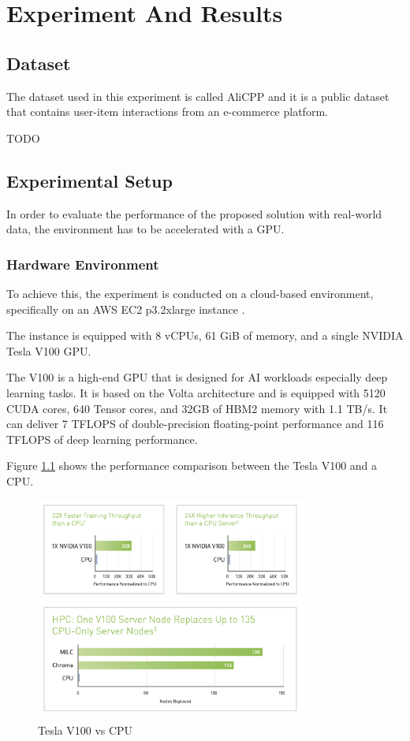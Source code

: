 \chapter{Experiment And Results}
\minitoc

\section{Dataset}

The dataset used in this experiment is called AliCPP and it is a public dataset that contains user-item interactions from an e-commerce platform.

TODO


\section{Experimental Setup}

In order to evaluate the performance of the proposed solution with real-world data, the environment has to be accelerated with a GPU.

\subsection{Hardware Environment}

To achieve this, the experiment is conducted on a cloud-based environment, specifically on an AWS EC2 p3.2xlarge instance \cite{AwsEc2P3}.

The instance is equipped with 8 vCPUs, 61 GiB of memory, and a single NVIDIA Tesla V100 GPU.

The V100 is a high-end GPU that is designed for AI workloads especially deep learning tasks.
It is based on the Volta architecture and is equipped with 5120 CUDA cores, 640 Tensor cores, and 32GB of HBM2 memory with 1.1 TB/s.
It can deliver 7 TFLOPS of double-precision floating-point performance and 116 TFLOPS of deep learning performance.

Figure \ref{fig:V100vsCPU} shows the performance comparison between the Tesla V100 and a CPU.


\begin{figure}[H]
    \centering
    \includegraphics[width=0.8\textwidth]{assets/v100-vs-cpu.png}
    \caption[Tesla V100 vs CPU]{Tesla V100 vs CPU \cite{NvidiaV100DataSheet}}
    \label{fig:V100vsCPU}
\end{figure}

